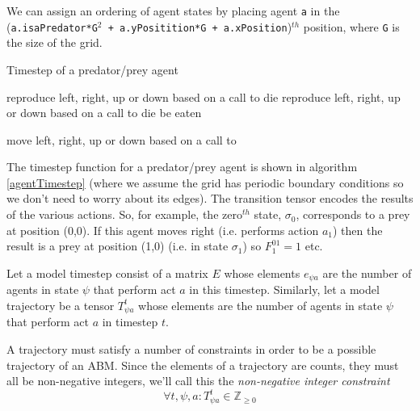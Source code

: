 \documentclass{article}
\begin{document}
We can assign an ordering of agent states by placing agent \texttt{a} in the (\texttt{a.isaPredator*G$^2$ + a.yPositition*G + a.xPosition})$^{th}$ position, where \texttt{G} is the size of the grid.

\begin{algorithm}
\caption{Timestep of a predator/prey agent}
\label{agentTimestep}
\begin{algorithmic}
    \State\Return reproduce left, right, up or down based on a call to 
  \EndIf
    \State\Return die
  \EndIf
\Else
    \State\Return reproduce left, right, up or down based on a call to 
  \EndIf
    \State\Return die
  \EndIf
    \State\Return be eaten
  \EndIf
  
\EndIf
\State \Return move left, right, up or down based on a call to 
\EndFunction
\end{algorithmic}
\end{algorithm}

The timestep function for a predator/prey agent is shown in algorithm \ref{agentTimestep} (where we assume the grid has periodic boundary conditions so we don't need to worry about its edges). The transition tensor encodes the results of the various actions. So, for example, the zero$^{th}$ state, $\sigma_0$, corresponds to a prey at position (0,0). If this agent moves right (i.e. performs action $a_1$) then the result is a prey at position (1,0) (i.e. in state $\sigma_1$) so $F^{01}_1 = 1$ etc.

Let a model timestep consist of a matrix $E$ whose elements $e_{\psi a}$ are the number of agents in state $\psi$ that perform act $a$ in this timestep. Similarly, let a model trajectory be a tensor $T^t_{\psi a}$ whose elements are the number of agents in state $\psi$ that perform act $a$ in timestep $t$.

A trajectory must satisfy a number of constraints in order to be a possible trajectory of an ABM. Since the elements of a trajectory are counts, they must all be non-negative integers, we'll call this the \textit{non-negative integer constraint}
\begin{equation}
\forall t,\psi, a: T^t_{\psi a} \in \mathbb{Z}_{\ge 0}
\label{nonNegativeInt}
\end{equation}
\end{document}
